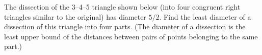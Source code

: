 The dissection of the 3--4--5 triangle shown below (into four
congruent right triangles similar to the original)
has diameter $5/2$.
Find the least diameter of a dissection of this triangle into four parts.
(The diameter of a dissection is the least upper bound of the distances
between pairs of points belonging to the same part.)
